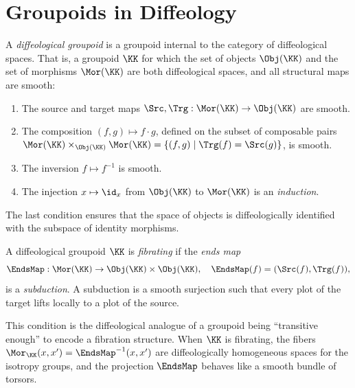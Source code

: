 \section{Groupoids in Diffeology}
\label{sec:Groupoids in Diffeology}

A \emph{diffeological groupoid} is a groupoid internal to the category of diffeological spaces.
That is, a groupoid $\KK$ for which the set of objects $\Obj(\KK)$ and the set of morphisms $\Mor(\KK)$ are both diffeological spaces,
and all structural maps are smooth:
\begin{enumerate}
  \item The source and target maps $\Src, \Trg: \Mor(\KK) \to \Obj(\KK)$ are smooth.
  \item The composition $(f,g) \mapsto f \cdot g$,
  defined on the subset of composable pairs
  $\Mor(\KK) \times_{\Obj(\KK)} \Mor(\KK) = \{ (f,g) \mid \Trg(f) = \Src(g) \}$,
  is smooth.
  \item The inversion $f \mapsto f^{-1}$ is smooth.
  \item The injection $x \mapsto \id_x$ from $\Obj(\KK)$ to $\Mor(\KK)$ is an \emph{induction}.
\end{enumerate}
The last condition ensures that the space of objects is diffeologically identified with the subspace of identity morphisms.

\begin{article}
  A diffeological groupoid $\KK$ is \emph{fibrating} if the \emph{ends map}
  \[
    \EndsMap: \Mor(\KK) \to \Obj(\KK) \times \Obj(\KK), \quad
    \EndsMap(f) = (\Src(f), \Trg(f)),
    \]
  is a \emph{subduction}.
  A subduction is a smooth surjection such that every plot of the target lifts locally to a plot of the source.
  
  This condition is the diffeological analogue of a groupoid being ``transitive enough''
  to encode a fibration structure.
  When $\KK$ is fibrating,
  the fibers $\Mor_{\KK}(x,x') = \EndsMap^{-1}(x,x')$ are diffeologically homogeneous spaces for the isotropy groups,
  and the projection $\EndsMap$ behaves like a smooth bundle of torsors.
\end{article}

